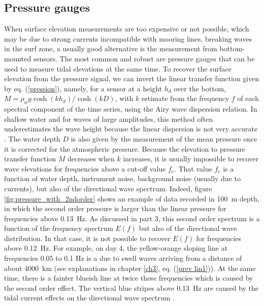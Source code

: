  \subsection{Pressure gauges}
 When surface elevation measurements are too expensive or not possible, which may be due to strong currents incompatible with mooring lines, breaking waves in the surf zone, a usually good alternative is the measurement from bottom-mounted sensors. The most common and robust are pressure gauges that can be used to measure 
 tidal elevations at the same time. To recover the surface elevation from the pressure signal, we can invert the linear transfer function given by eq. (\ref{pression}), 
 namely, for a sensor at a height $h_d$ over the bottom,  $M=\rho_w g \cosh(kh_d)/\cosh(kD)$, with $k$ estimate from the frequency $f$ of each spectral component of the time series, using the Airy wave dispersion relation. In shallow water and for waves of large amplitudes, this method often underestimates the wave height because the linear dispersion is not very accurate \citep{Filipot&al.2010,Bonneton&Lannes2017}. The water depth $D$ is also given by the measurement of 
 the mean pressure once it is corrected for the atmospheric pressure. Because the elevation to pressure transfer function $M$ decreases when  $k$ increases, it is usually impossible to recover  wave elevations for frequencies above a cut-off value $f_c$. That value $f_c$ is a function of water
 depth, instrument noise, background noise (usually due to currents), but also of the directional wave spectrum. Indeed, figure \ref{fig:pressure_with_2ndorder}
 shows an example of data recorded in 100~m depth, in which the second order pressure is larger than the linear pressure for frequencies above 0.13~Hz. As discussed in part 3, 
 this second order spectrum is a function of the frequency spectrum $E(f)$ but also of the directional wave distribution. In that case, it is not possible 
 to recover $E(f)$ for frequencies above 0.12~Hz. For example, on day 4, the yellow-orange sloping line at frequencies 0.05 to 0.1 Hz is 
 a due to swell waves arriving from a distance of about 4000~km (see explanations in chapter \ref{ch3}, eq. (\ref{prev lin1})). 
 At the same time, there is a fainter blueish line at twice these frequencies which is caused by the 
 second order effect. The vertical blue stripes above 0.13~Hz are caused by the tidal current effects on the directional wave spectrum \citep{Ardhuin&al.2013}.
